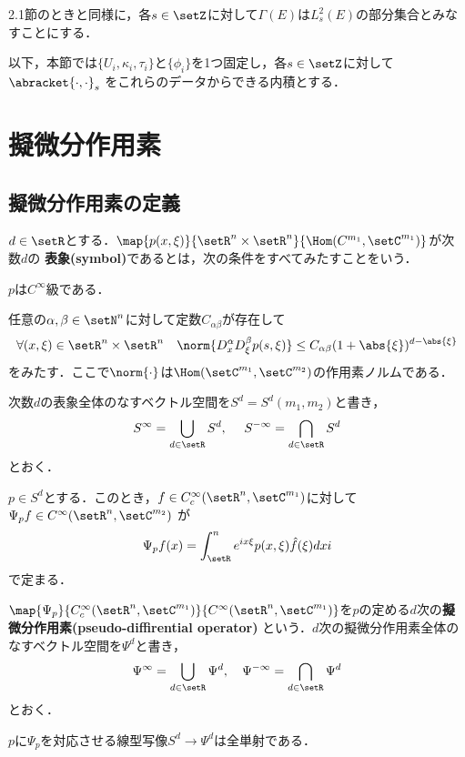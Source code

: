 \documentclass[uplatex,dvipdfmx]{jsarticle}
\newcommand{\smooth}{$C^{\infty}$級}
\newcommand{\sobolev}[1]{L^{2}_{#1}}
\newcommand{\smoothfct}[2]{C^{\infty}(\setR^{#1},\setC^{#2})}
\newcommand{\cptsmoothfct}[2]{C^{\infty}_{c}(\setR^{#1},\setC^{#2})}
\newcommand{\dd}{d} %
\begin{document}
2.1節のときと同様に，各$s\in\setZ$に対して$\Gamma(E)$は$\sobolev{s}(E)$の部分集合とみなすことにする．

以下，本節では$\{U_i,\kappa_i,\tau_i\}$と$\{\phi_i\}$を1つ固定し，各$s\in\setZ$に対して$\abracket{\cdot,\cdot}_s$
をこれらのデータからできる内積とする．

\newpage
\section{擬微分作用素}

\subsection{擬微分作用素の定義}

\begin{definition}
  $d\in\setR$とする．$\map{p(x,\xi)}{\setR^n\times \setR^n}{\Hom(C^{m_1},\setC^{m_1})}$が次数$d$の
  \textbf{表象(symbol)}であるとは，次の条件をすべてみたすことをいう．
  \begin{enumarabicp}
    \item $p$は\smooth である．
    \item 任意の$\alpha,\beta\in\setN^n$に対して定数$C_{\alpha\beta}$が存在して
    \[ \forall (x,\xi) \in \setR^n\times\setR^n\quad \norm{D^\alpha_x D^\beta_\xi p(s,\xi)} \leq C_{\alpha \beta}(1+\abs{\xi})^{d-\abs{\xi}} \]
    をみたす．ここで$\norm{\cdot}$は$\Hom(\setC^{m_1},\setC^{m_2})$の作用素ノルムである．
  \end{enumarabicp}
  次数$d$の表象全体のなすベクトル空間を$S^d=S^d(m_1,m_2)$と書き，
  \[ S^\infty = \bigcup_{d\in\setR} S^d,\ \quad S^{-\infty} = \bigcap_{d\in\setR} S^d \]
  とおく．
\end{definition}

$p\in S^d$とする．このとき，$f\in \cptsmoothfct{n}{m_1}$に対して$\Psi_p f\in \smoothfct{n}{m_2}$
が
\[ \Psi_p f(x) = \int_\setR^n e^{ix\xi} p(x,\xi)\hat{f}(\xi)\dd xi \]
で定まる．

\begin{definition}
  $\map{\Psi_p}{\cptsmoothfct{n}{m_1}}{\smoothfct{n}{m_1}}$を$p$の定める$d$次の\textbf{擬微分作用素(pseudo-diffirential operator)}
  という．$d$次の擬微分作用素全体のなすベクトル空間を$\Psi^d$と書き，
  \[ \Psi^\infty = \bigcup_{d\in \setR} \Psi^d,\quad \Psi^{-\infty} = \bigcap_{d\in \setR} \Psi^d \]
  とおく．
\end{definition}

\begin{lemma}\label{symbol injectivity}
  $p$に$\Psi_p$を対応させる線型写像$S^d\to \Psi^d$は全単射である．
\end{lemma}
\end{document}
